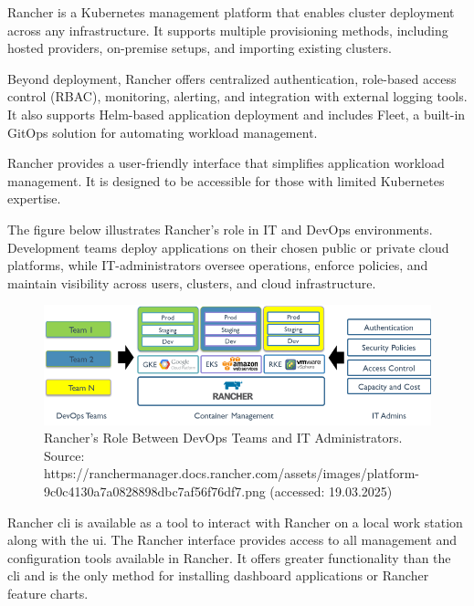 \documentclass[../main.tex]{subfiles}
\begin{document}
Rancher is a Kubernetes management platform that enables cluster deployment across any infrastructure. It supports multiple provisioning methods, including hosted providers, on-premise setups, and importing existing clusters. 

Beyond deployment, Rancher offers centralized authentication, role-based access control (RBAC), monitoring, alerting, and integration with external logging tools. It also supports Helm-based application deployment and includes Fleet, a built-in GitOps solution for automating workload management. \cite{rancher}

Rancher provides a user-friendly interface that simplifies application workload management. It is designed to be accessible for those with limited Kubernetes expertise.

The figure below illustrates Rancher’s role in IT and DevOps environments. Development teams deploy applications on their chosen public or private cloud platforms, while IT-administrators oversee operations, enforce policies, and maintain visibility across users, clusters, and cloud infrastructure.

\begin{figure}[H]
    \centering
    \includegraphics[scale=0.5]{img/3-background/rancher/rancher_devops_teams.png}
    \caption{Rancher’s Role Between DevOps Teams and IT Administrators. 
    Source: https://ranchermanager.docs.rancher.com/assets/images/platform-9c0c4130a7a0828898dbc7af56f76df7.png (accessed: 19.03.2025)}
    \label{fig:rancher_devops_teams}
\end{figure}

Rancher \gls{cli} is available as a tool to interact with Rancher on a local work station along with the \gls{ui}. The Rancher interface provides access to all management and configuration tools available in Rancher. It offers greater functionality than the \gls{cli} and is the only method for installing dashboard applications or Rancher feature charts.
\end{document}
